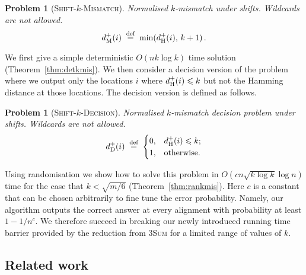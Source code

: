 \documentclass[11pt]{article}
\renewcommand{\leq}{\leqslant}
\newcommand{\DsHam}{\ensuremath{d_\textup{H}^+}}
\newcommand{\skMismatch}{\textsc{Shift-$k$-Mismatch}\xspace}
\newcommand{\DskMismatch}{\ensuremath{d_\textup{M}^+}}
\newcommand{\skDecision}{\textsc{Shift-$k$-Decision}\xspace}
\newcommand{\DskDecision}{\ensuremath{d_\textup{D}^+}}
\newcommand{\threeSUM}{\textsc{3Sum}\xspace}
\newcommand{\margin}[1]{}
\theoremstyle{plain}
\newtheorem{problem}[theorem]{Problem}
\theoremstyle{definition}
\begin{document}
\begin{problem}[\skMismatch]
    \label{prob:skMismatch}
    Normalised $k$-mismatch under shifts. Wildcards are not allowed.
\begin{equation*}
        \DskMismatch(i) \eqdef \min(\DsHam(i),\, k+1) \,.
    \end{equation*}
\end{problem}

We first give a simple deterministic $O(nk \log k)$ time solution (Theorem~\ref{thm:detkmis}).   We then consider a decision version of the problem where we output only the locations $i$ where $\DsHam(i) \leq k$ but not the Hamming distance at those locations. The decision version is defined as follows.

\begin{problem}[\skDecision]
    \label{prob:skDecision}
    Normalised $k$-mismatch decision problem under shifts. Wildcards are not allowed.
\begin{equation*}
        \DskDecision(i) \eqdef
            \begin{cases}
                0, & \text{$\DsHam(i) \leq k$;} \\
                1, & \text{otherwise.}
            \end{cases}
    \end{equation*}
\end{problem}

Using randomisation we show how to solve this problem in $O(cn\sqrt{k\log k}\log n)$ time for the case that $k < \sqrt{m/6}$ (Theorem~\ref{thm:rankmis}). Here $c$ is a constant that can be chosen arbitrarily to fine tune the error probability. Namely, our algorithm outputs the correct answer at every alignment with probability at least $1-1/n^c$.  We therefore succeed in breaking our newly introduced running time barrier provided by the reduction from \threeSUM for a limited range of values of $k$.



\subsection{Related work}

\margin{Transposition inv: Add in transposition invariant previous work}
\end{document}
